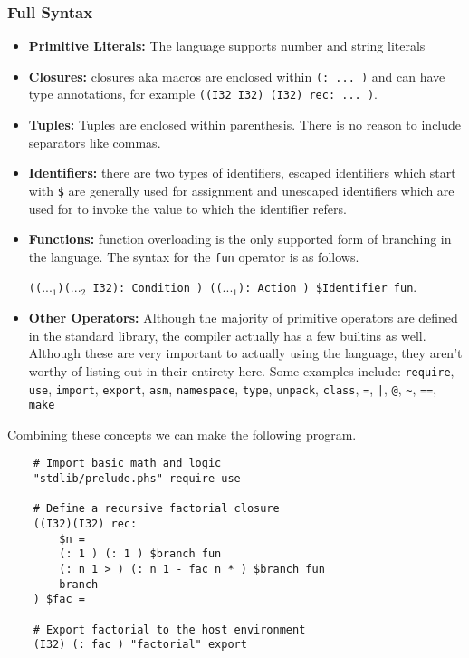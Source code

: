 \documentclass[acmsmall, review]{acmart}
\theoremstyle{definition}
\begin{document}
\subsubsection{Full Syntax}
\begin{itemize}
    \item \textbf{Primitive Literals:} The language supports number and string literals

    \item \textbf{Closures:} closures aka macros are enclosed within \texttt{(: ... )} and can have type annotations, for example \texttt{((I32 I32) (I32) rec: ... )}.

    \item \textbf{Tuples:} Tuples are enclosed within parenthesis. There is no reason to include separators like commas.

    \item \textbf{Identifiers:} there are two types of identifiers, escaped identifiers which start with \texttt{\$} are generally used for assignment and unescaped identifiers which are used for to invoke the value to which the identifier refers.

    \item \textbf{Functions:} function overloading is the only supported form of branching in the language. The syntax for the \texttt{fun} operator is as follows. 

    \texttt{(($..._1$)($..._2$ I32): Condition ) (($..._1$): Action ) \$Identifier fun}.

    \item \textbf{Other Operators:} Although the majority of primitive operators are defined in the standard library, the compiler actually has a few builtins as well. Although these are very important to actually using the language, they aren't worthy of listing out in their entirety here. Some examples include: \texttt{require}, \texttt{use}, \texttt{import}, \texttt{export}, \texttt{asm}, \texttt{namespace}, \texttt{type}, \texttt{unpack}, \texttt{class}, \texttt{=}, \texttt{|}, \texttt{@}, \texttt{\~}, \texttt{==}, \texttt{make}
\end{itemize}
    
    Combining these concepts we can make the following program.
    
    \begin{verbatim}
    # Import basic math and logic
    "stdlib/prelude.phs" require use

    # Define a recursive factorial closure
    ((I32)(I32) rec:
        $n =
        (: 1 ) (: 1 ) $branch fun
        (: n 1 > ) (: n 1 - fac n * ) $branch fun
        branch
    ) $fac =
    
    # Export factorial to the host environment
    (I32) (: fac ) "factorial" export
    \end{verbatim}
    
\end{document}
